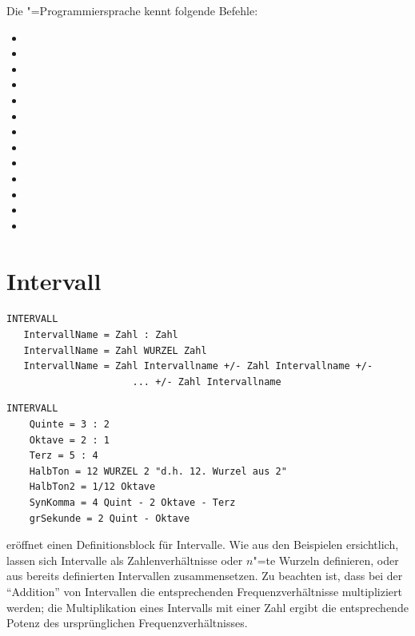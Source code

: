 {Die \mutabor{}"=Programmiersprache kennt folgende Befehle:

\begin{itemize}
\item {}
\item {}
\item {}
\item {}
\item {}
\item {}
\item {}
\item {}
\item {}
\item {}
\item {}
\item {}
\item {}
\end{itemize}

\section{Intervall}
\label{sec:SX_INTERVAL}



\begin{verbatim}
INTERVALL
   IntervallName = Zahl : Zahl
   IntervallName = Zahl WURZEL Zahl
   IntervallName = Zahl Intervallname +/- Zahl Intervallname +/- 
                      ... +/- Zahl Intervallname
\end{verbatim}



\begin{verbatim}
INTERVALL
    Quinte = 3 : 2 
    Oktave = 2 : 1 
    Terz = 5 : 4 
    HalbTon = 12 WURZEL 2 "d.h. 12. Wurzel aus 2" 
    HalbTon2 = 1/12 Oktave 
    SynKomma = 4 Quint - 2 Oktave - Terz 
    grSekunde = 2 Quint - Oktave
\end{verbatim}




 eröffnet einen Definitionsblock für Intervalle.  Wie aus den
Beispielen ersichtlich, lassen sich Intervalle als Zahlenverhältnisse
oder $n$"=te Wurzeln definieren, oder aus bereits definierten
Intervallen zusammensetzen. Zu beachten ist, dass bei der "`Addition"'
von Intervallen die entsprechenden Frequenzverhältnisse multipliziert
werden; die Multiplikation eines Intervalls mit einer Zahl ergibt die
entsprechende Potenz des ursprünglichen Frequenzverhältnisses.

}
